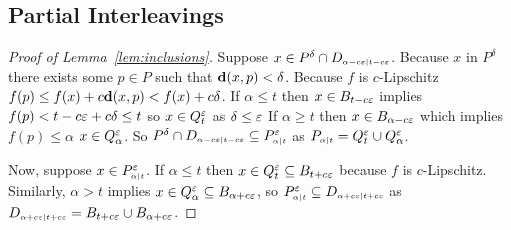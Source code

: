 \subsection{Partial Interleavings}

%

\begin{proof}[Proof of Lemma~\ref{lem:inclusions}]
  Suppose $x\in P^\delta\cap D\subi{t-c\e}{\alpha-c\e}$.
  Because $x$ in $P^\delta$ there exists some $p\in P$ such that $\dist(x,p) < \delta$.
  Because $f$ is $c$-Lipschitz $f(p)\leq f(x) + c\dist(x,p) < f(x) + c\delta$.
  If $\alpha\leq t$ then $x\in B_{t-c\e}$ implies $f(p) < t-c\e + c\delta \leq t$ so $x\in Q_t^\e$ as $\delta\leq\e$
  If $\alpha\geq t$ then $x\in B_{\alpha-c\e}$ which implies $f(p) \leq \alpha$ $x\in Q_\alpha^\e$.
  So $P^\delta\cap D\subi{t-c\e}{\alpha-c\e}\subseteq P\subi{t}{\alpha}^\e$ as $P\subi{t}{\alpha} = Q_t^\e\cup Q_\alpha^\e$.

  Now, suppose $x\in P\subi{t}{\alpha}^\e$.
  If $\alpha\leq t$ then $x\in Q_t^\e\subseteq B_{t+c\e}$ because $f$ is $c$-Lipschitz.
  Similarly, $\alpha > t$ implies $x\in Q_\alpha^\e\subseteq B_{\alpha+c\e}$, so $P\subi{t}{\alpha}^\e\subseteq D\subi{t+c\e}{\alpha+c\e}$ as $D\subi{t+c\e}{\alpha+c\e} = B_{t+c\e}\cup B_{\alpha+c\e}$.
\end{proof}

